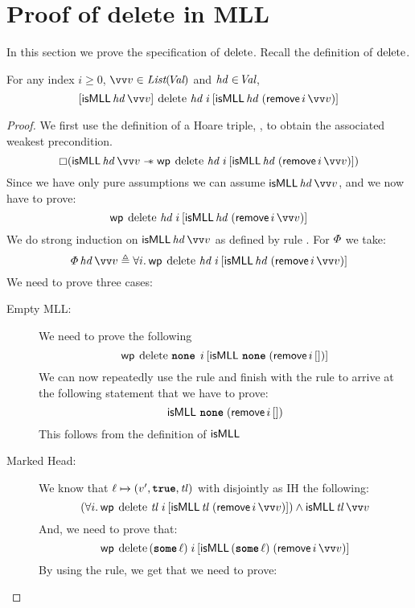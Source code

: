 \documentclass[thesis.tex]{subfiles}
\begin{document}
\section{Proof of delete in MLL}
\label{sec:proofmll}
In this section we prove the specification of $\operatorname{delete}$. Recall the definition of $\operatorname{delete}$.
\MLLDeleteProg
\\
\begin{lemma}{}{}
    For any index $i \ge 0$, $\vect{\val} \in \List(\Val)$  and $\mathit{hd}\in\kern-0.2em\textit{Val}$,
    \[
        \hoare{\isMLL\, \hd\, \vect{\val}}{\MLLdelete\, \hd\; \iindex }{\isMLL\, \hd\; (\textlog{remove}\, \iindex\, \vect{v})}
    \]
\end{lemma}
\begin{proof}
    We first use the definition of a Hoare triple, , to obtain the associated weakest precondition.
    \[\always(\isMLL\, \hd\, \vect{\val} \wand \wpre{\MLLdelete\, \hd\; \iindex}{\isMLL\, \hd\; (\textlog{remove}\, \iindex\, \vect{v})})\]
    Since we have only pure assumptions we can assume
    $\isMLL\, \hd\, \vect{\val}$, and we now have to prove:
    \[\wpre{\MLLdelete\, \hd\; \iindex}{\isMLL\, \hd\; (\textlog{remove}\, \iindex\, \vect{v})}\]
    We do strong induction on $\isMLL\, \hd\, \vect{\val}$ as defined by rule . For $\varPhi$ we take:
    \[
        \pred\, \hd\, \vect{\val} \eqdef \All \iindex. \wpre{\MLLdelete\, \hd\; \iindex}{\isMLL\, \hd\; (\textlog{remove}\, \iindex\, \vect{v})}
    \]
    We need to prove three cases:
    \begin{description}
        \item[Empty MLL:] We need to prove the following
              \[\wpre{\MLLdelete\, \None\; \iindex}{\isMLL\, \None\; (\textlog{remove}\, \iindex\, [])}\]
              We can now repeatedly use the  rule and finish with the rule  to arrive at the following statement that we have to prove:
              \[\textsf{\upshape isMLL}\, \operatorname{\texttt{\upshape \bfseries none}}\; (\textsf{\upshape remove}\, i\, [])\]
              This follows from the definition of $\textsf{\upshape isMLL}$
        \item[Marked Head:] We know that $\loc \fmapsto (\val', \True, \tl)$ with disjointly as IH the following:
              \[\left(\All \iindex. \wpre{\MLLdelete\, \tl\; \iindex}{\isMLL\, \tl\; (\textlog{remove}\, \iindex\, \vect{\val})}\right) \land \isMLL\, \tl\, \vect{\val}\]
              And, we need to prove that:
              \[\wpre{\MLLdelete\, (\Some \loc)\; \iindex}{\isMLL\, (\Some \loc)\; (\textlog{remove}\, \iindex\, \vect{v})}\]
              By using the  rule, we get that we need to prove:

\end{description}
\end{proof}
\end{document}
